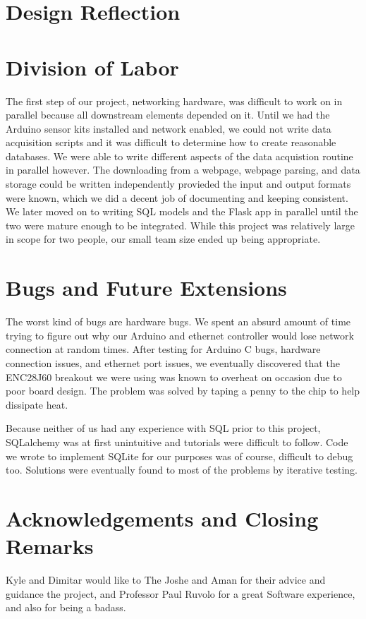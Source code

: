 \documentclass{article}
\begin{document}
\section*{Design Reflection}

\section*{Division of Labor}
\par The first step of our project, networking hardware, was difficult to work on in parallel because all downstream elements depended on it. Until we had the Arduino sensor kits installed and network enabled, we could not write data acquisition scripts and it was difficult to determine how to create reasonable databases. We were able to write different aspects of the data acquistion routine in parallel however. The downloading from a webpage, webpage parsing, and data storage could be written independently provieded the input and output formats were known, which we did a decent job of documenting and keeping consistent. We later moved on to writing SQL models and the Flask app in parallel until the two were mature enough to be integrated. While this project was relatively large in scope for two people, our small team size ended up being appropriate.

\section*{Bugs and Future Extensions}
\par The worst kind of bugs are hardware bugs. We spent an absurd amount of time trying to figure out why our Arduino and ethernet controller would lose network connection at random times. After testing for Arduino C bugs, hardware connection issues, and ethernet port issues, we eventually discovered that the ENC28J60 breakout we were using was known to overheat on occasion due to poor board design. The problem was solved by taping a penny to the chip to help dissipate heat. 

\par Because neither of us had any experience with SQL prior to this project, SQLalchemy was at first unintuitive and tutorials were difficult to follow. Code we wrote to implement SQLite for our purposes was of course, difficult to debug too. Solutions were eventually found to most of the problems by iterative testing.


\section*{Acknowledgements and Closing Remarks}
Kyle and Dimitar would like to The Joshe and Aman for their advice and guidance the project, and Professor Paul Ruvolo for a great Software experience, and also for being a badass.
\end{document}
